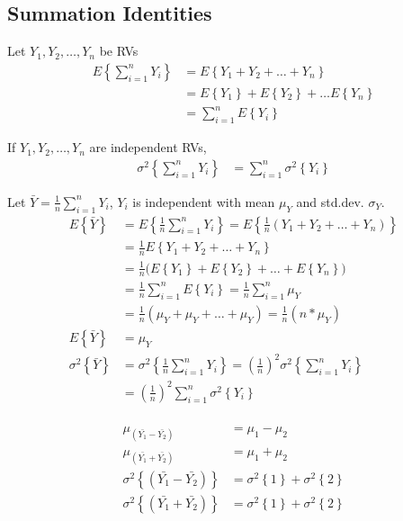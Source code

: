 \documentclass[10pt]{article}
\newcommand{\mean}[1]{\mu_{#1}}
\renewcommand{\exp}[1]{E\left\{#1\right\}} %
\newcommand{\var}[1]{\sigma^2\left\{#1\right\}}
\newcommand{\sigdev}[1]{\sigma_{#1}}
\begin{document}
\begin{multicols}{3}
    \subsection{Summation Identities}

    Let $Y_1, Y_2, \dots, Y_n$ be RVs
    \begin{align*}
        \exp{\sum^n_{i=1} Y_i} & = \exp{Y_1 + Y_2 + \dots + Y_n}           \\
                               & = \exp{Y_1} + \exp{Y_2} + \dots \exp{Y_n} \\
                               & = \sum^n_{i=1} \exp{Y_i}
    \end{align*}

    If $Y_1, Y_2, \dots, Y_n$ are independent RVs,
    \begin{align*}
        \var{\sum^n_{i=1} Y_i} & = \sum^n_{i=1} \var{Y_i}
    \end{align*}

    Let $\bar Y = \frac{1}{n} \sum^n_{i=1} Y_i$, $Y_i$ is independent with mean $\mean{Y}$ and std.dev. $\sigdev{Y}$.
    \begin{align*}
        \exp{\bar Y} & = \exp{\frac{1}{n} \sum^n_{i=1} Y_i} = \exp{\frac{1}{n} (Y_1 + Y_2 + \dots + Y_n)}       \\
                     & = \frac{1}{n} \exp{Y_1 + Y_2 + \dots + Y_n}                                              \\
                     & = \frac{1}{n} \Big(\exp{Y_1} + \exp{Y_2} + \dots + \exp{Y_n}\Big)                        \\
                     & = \frac{1}{n} \sum^n_{i=1} \exp{Y_i} = \frac{1}{n} \sum^n_{i=1} \mean{Y}                 \\
                     & = \frac{1}{n} (\mean{Y} + \mean{Y} + \dots + \mean{Y}) = \frac{1}{n} (n*\mean{Y})        \\
        \exp{\bar Y} & = \mean{Y}                                                                               \\
        \var{\bar Y} & = \var{\frac{1}{n} \sum^n_{i=1} Y_i} = \left(\frac{1}{n}\right)^2 \var{\sum^n_{i=1} Y_i} \\
                     & = \left(\frac{1}{n}\right)^2 \sum^n_{i=1} \var{Y_i}                                      \\
    \end{align*}

    \begin{align*}
        \mean{(\bar{Y_1} - \bar{Y_2})} & = \mean{1} - \mean{2} \\
        \mean{(\bar{Y_1} + \bar{Y_2})} & = \mean{1} + \mean{2} \\
        \var{(\bar{Y_1} - \bar{Y_2})} & = \var{1} + \var{2} \\
        \var{(\bar{Y_1} + \bar{Y_2})} & = \var{1} + \var{2} 
    \end{align*}


\end{multicols}
\end{document}
